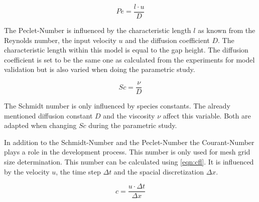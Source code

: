\documentclass[../thesis.tex]{subfiles}
\begin{document}
\begin{equation}
	\label{eqn: Pe}
	Pe = \dfrac{l \cdot u}{D}
\end{equation}

The Peclet-Number is influenced by the characteristic length $l$ as known from the Reynolds number, the input velocity $u$ and the diffusion coefficient $D$. The characteristic length within this model is equal to the gap height. The diffusion coefficient is set to be the same one as calculated from the experiments for model validation but is also varied when doing the parametric study.

\begin{equation}
	\label{eqn: Sc}
	Sc = \dfrac{\nu}{D}
\end{equation}

The Schmidt number is only influenced by species constants. The already mentioned diffusion constant $D$ and the viscosity $\nu$ affect this variable. Both are adapted when changing $Sc$ during the parametric study.

In addition to the Schmidt-Number and the Peclet-Number the Courant-Number plays a role in the development process. This number is only used for mesh grid size determination. This number can be calculated using \autoref{eqn:cfl}. It is influenced by the velocity $u$, the time step $ \Delta t$ and the spacial discretization $\Delta x$.

\begin{equation}
	\label{eqn:cfl}
	c = \dfrac{u \cdot \Delta t}{\Delta x}
\end{equation}
\end{document}
